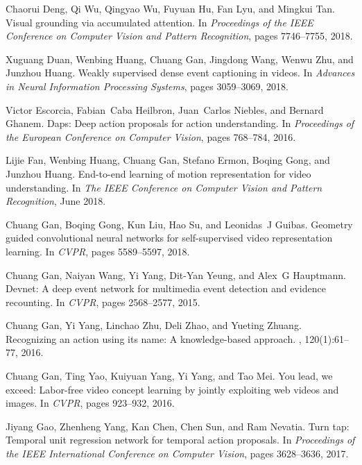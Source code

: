 \documentclass[10pt,twocolumn,letterpaper]{article}
\begin{document}
\begin{thebibliography}{10}
	Chaorui Deng, Qi Wu, Qingyao Wu, Fuyuan Hu, Fan Lyu, and Mingkui Tan.
	\newblock Visual grounding via accumulated attention.
	\newblock In {\em Proceedings of the IEEE Conference on Computer Vision and
		Pattern Recognition}, pages 7746--7755, 2018.
	
	Xuguang Duan, Wenbing Huang, Chuang Gan, Jingdong Wang, Wenwu Zhu, and Junzhou
	Huang.
	\newblock Weakly supervised dense event captioning in videos.
	\newblock In {\em Advances in Neural Information Processing Systems}, pages
	3059--3069, 2018.
	
	Victor Escorcia, Fabian~Caba Heilbron, Juan~Carlos Niebles, and Bernard Ghanem.
	\newblock Daps: Deep action proposals for action understanding.
	\newblock In {\em Proceedings of the European Conference on Computer Vision},
	pages 768--784, 2016.
	
	Lijie Fan, Wenbing Huang, Chuang Gan, Stefano Ermon, Boqing Gong, and Junzhou
	Huang.
	\newblock End-to-end learning of motion representation for video understanding.
	\newblock In {\em The IEEE Conference on Computer Vision and Pattern
		Recognition}, June 2018.
	
	Chuang Gan, Boqing Gong, Kun Liu, Hao Su, and Leonidas~J Guibas.
	\newblock Geometry guided convolutional neural networks for self-supervised
	video representation learning.
	\newblock In {\em CVPR}, pages 5589--5597, 2018.
	
	Chuang Gan, Naiyan Wang, Yi Yang, Dit-Yan Yeung, and Alex~G Hauptmann.
	\newblock Devnet: A deep event network for multimedia event detection and
	evidence recounting.
	\newblock In {\em CVPR}, pages 2568--2577, 2015.
	
	Chuang Gan, Yi Yang, Linchao Zhu, Deli Zhao, and Yueting Zhuang.
	\newblock Recognizing an action using its name: A knowledge-based approach.
	, 120(1):61--77, 2016.
	
	Chuang Gan, Ting Yao, Kuiyuan Yang, Yi Yang, and Tao Mei.
	\newblock You lead, we exceed: Labor-free video concept learning by jointly
	exploiting web videos and images.
	\newblock In {\em CVPR}, pages 923--932, 2016.
	
	Jiyang Gao, Zhenheng Yang, Kan Chen, Chen Sun, and Ram Nevatia.
	\newblock Turn tap: Temporal unit regression network for temporal action
	proposals.
	\newblock In {\em Proceedings of the IEEE International Conference on Computer
		Vision}, pages 3628--3636, 2017.
	

\end{thebibliography}
\end{document}
